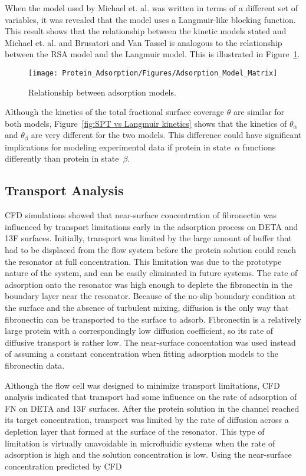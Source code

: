When the model used by Michael et. al. \cite{Michael2003} was written
in terms of a different set of variables, it was revealed that the
model uses a Langmuir-like blocking function. This result shows that
the relationship between the kinetic models stated and Michael et.
al. and Brusatori and Van Tassel is analogous to the relationship
between the RSA model and the Langmuir model. This is illustrated
in Figure~\ref{fig:Adsorption Model Matrix}.%
\begin{figure}
\texttt{[image: Protein\_Adsorption/Figures/Adsorption\_Model\_Matrix]}

\caption{\label{fig:Adsorption Model Matrix}Relationship between adsorption
models.}


%
\end{figure}
 Although the kinetics of the total fractional surface coverage $\theta$
are similar for both models, Figure~\ref{fig:SPT vs Langmuir kinetics}
shows that the kinetics of $\theta_{\alpha}$ and $\theta_{\beta}$
are very different for the two models. This difference could have
significant implications for modeling experimental data if protein
in state~$\alpha$ functions differently than protein in state~$\beta$.


\subsection{Transport Analysis}

CFD simulations showed that near-surface concentration of fibronectin
was influenced by transport limitations early in the adsorption process
on DETA and 13F surfaces. Initially, transport was limited by the
large amount of buffer that had to be displaced from the flow system
before the protein solution could reach the resonator at full concentration.
This limitation was due to the prototype nature of the system, and
can be easily eliminated in future systems. The rate of adsorption
onto the resonator was high enough to deplete the fibronectin in the
boundary layer near the resonator. Because of the no-slip boundary
condition at the surface and the absence of turbulent mixing, diffusion
is the only way that fibronectin can be transported to the surface
to adsorb. Fibronectin is a relatively large protein with a correspondingly
low diffusion coefficient, so its rate of diffusive transport is rather
low. The near-surface concentation was used instead of assuming a
constant concentration when fitting adsorption models to the fibronectin
data.

Although the flow cell was designed to minimize transport limitations,
CFD analysis indicated that transport had some influence on the rate
of adsorption of FN on DETA and 13F surfaces. After the protein solution
in the channel reached its target concentration, transport was limited
by the rate of diffusion across a depletion layer that formed at the
surface of the resonator. This type of limitation is virtually unavoidable
in microfluidic systems when the rate of adsorption is high and the
solution concentration is low. Using the near-surface concentration
predicted by CFD 

